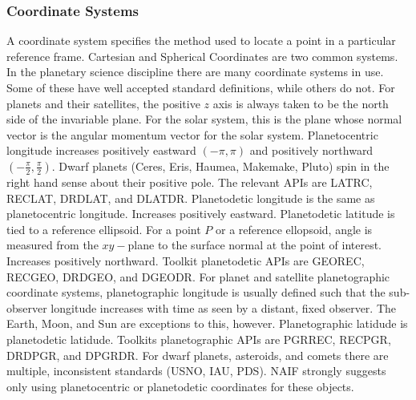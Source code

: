 \documentclass[crop=false,class=article,oneside]{standalone}
\begin{document}
            \subsubsection{Coordinate Systems}
            A coordinate system specifies the method used to locate a point in a particular reference frame. Cartesian and Spherical Coordinates are two common systems. In the planetary science discipline there are many coordinate systems in use. Some of these have well accepted standard definitions, while others do not. For planets and their satellites, the positive $z$ axis is always taken to be the north side of the invariable plane. For the solar system, this is the plane whose normal vector is the angular momentum vector for the solar system. Planetocentric longitude increases positively eastward $(-\pi, \pi)$ and positively northward $(-\frac{\pi}{2},\frac{\pi}{2})$. Dwarf planets (Ceres, Eris, Haumea, Makemake, Pluto) spin in the right hand sense about their positive pole. The relevant APIs are LATRC, RECLAT, DRDLAT, and DLATDR. Planetodetic longitude is the same as planetocentric longitude. Increases positively eastward. Planetodetic latitude is tied to a reference ellipsoid. For a point $P$ or a reference ellopsoid, angle is measured from the $xy-$plane to the surface normal at the point of interest. Increases positively northward. Toolkit planetodetic APIs are GEOREC, RECGEO, DRDGEO, and DGEODR. For planet and satellite planetographic coordinate systems, planetographic longitude is usually defined such that the sub-observer longitude increases with time as seen by a distant, fixed observer. The Earth, Moon, and Sun are exceptions to this, however. Planetographic latidude is planetodetic latidude. Toolkits planetographic APIs are PGRREC, RECPGR, DRDPGR, and DPGRDR. For dwarf planets, asteroids, and comets there are multiple, inconsistent standards (USNO, IAU, PDS). NAIF strongly suggests only using planetocentric or planetodetic coordinates for these objects. 
\end{document}

